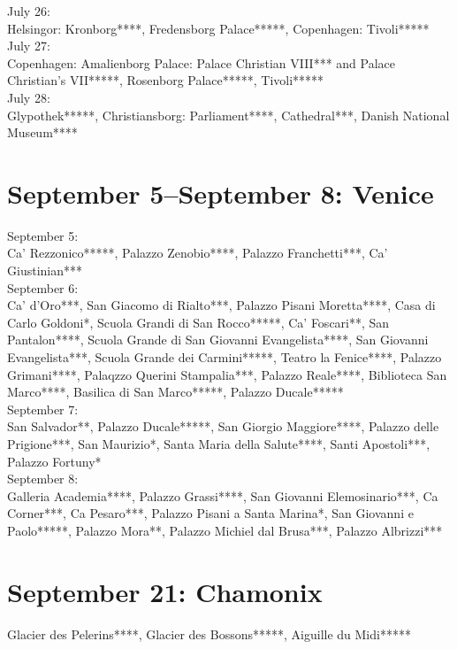 July 26:\\
Helsingor: Kronborg****, Fredensborg Palace*****, Copenhagen: Tivoli*****\\

July 27:\\
Copenhagen: Amalienborg Palace: Palace Christian VIII*** and Palace Christian's VII*****, Rosenborg Palace*****, Tivoli*****\\

July 28:\\
Glypothek*****, Christiansborg: Parliament****, Cathedral***, Danish National Museum****

\section{September 5--September 8: Venice}
\label{Venice2013}

September 5:\\
Ca' Rezzonico*****, Palazzo Zenobio****, Palazzo Franchetti***, Ca' Giustinian***\\

September 6:\\
Ca' d'Oro***, San Giacomo di Rialto***, Palazzo Pisani Moretta****, Casa di Carlo Goldoni*, Scuola Grandi di San Rocco*****, Ca' Foscari**, San Pantalon****, Scuola Grande di San Giovanni Evangelista****, San Giovanni Evangelista***, Scuola Grande dei Carmini*****, Teatro la Fenice****, Palazzo Grimani****, Palaqzzo Querini Stampalia***, Palazzo Reale****, Biblioteca San Marco****,  Basilica di San Marco*****, Palazzo Ducale*****\\

September 7:\\
San Salvador**, Palazzo Ducale*****, San Giorgio Maggiore****, Palazzo delle Prigione***, San Maurizio*, Santa Maria della Salute****, Santi Apostoli***,  Palazzo Fortuny*\\

September 8:\\
Galleria Academia****, Palazzo Grassi****, San Giovanni Elemosinario***, Ca Corner***, Ca Pesaro***, Palazzo Pisani a Santa Marina*, San Giovanni e Paolo*****, Palazzo Mora**, Palazzo Michiel dal Brusa***, Palazzo Albrizzi***

\section{September 21: Chamonix}
\label{Chamonix2013}

Glacier des Pelerins****, Glacier des Bossons*****, Aiguille du Midi*****


